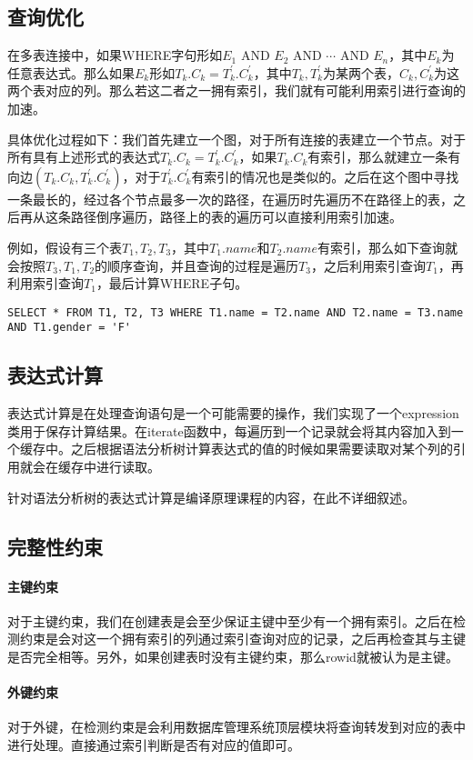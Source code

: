 \documentclass[10pt]{article}
\begin{document}
\subsection{查询优化}
在多表连接中，如果WHERE字句形如$E_1 \text{ AND } E_2 \text{ AND } \cdots \text{ AND } E_n$，其中$E_k$为任意表达式。那么如果$E_k$形如$T_k.C_k = T^\prime_k.C^\prime_k$，其中$T_k, T_k^\prime$为某两个表，$C_k, C_k^\prime$为这两个表对应的列。那么若这二者之一拥有索引，我们就有可能利用索引进行查询的加速。

具体优化过程如下：我们首先建立一个图，对于所有连接的表建立一个节点。对于所有具有上述形式的表达式$T_k.C_k = T^\prime_k.C^\prime_k$，如果$T_k.C_k$有索引，那么就建立一条有向边$(T_k.C_k, T_k^\prime.C_k^\prime)$，对于$T_k^\prime.C_k^\prime$有索引的情况也是类似的。之后在这个图中寻找一条最长的，经过各个节点最多一次的路径，在遍历时先遍历不在路径上的表，之后再从这条路径倒序遍历，路径上的表的遍历可以直接利用索引加速。

例如，假设有三个表$T_1, T_2, T_3$，其中$T_1.name$和$T_2.name$有索引，那么如下查询就会按照$T_3, T_1, T_2$的顺序查询，并且查询的过程是遍历$T_3$，之后利用索引查询$T_1$，再利用索引查询$T_1$，最后计算WHERE子句。
\begin{verbatim}
SELECT * FROM T1, T2, T3 WHERE T1.name = T2.name AND T2.name = T3.name AND T1.gender = 'F'
\end{verbatim}

\subsection{表达式计算}
表达式计算是在处理查询语句是一个可能需要的操作，我们实现了一个expression类用于保存计算结果。在iterate函数中，每遍历到一个记录就会将其内容加入到一个缓存中。之后根据语法分析树计算表达式的值的时候如果需要读取对某个列的引用就会在缓存中进行读取。

针对语法分析树的表达式计算是编译原理课程的内容，在此不详细叙述。
\subsection{完整性约束}
\paragraph{主键约束} 对于主键约束，我们在创建表是会至少保证主键中至少有一个拥有索引。之后在检测约束是会对这一个拥有索引的列通过索引查询对应的记录，之后再检查其与主键是否完全相等。另外，如果创建表时没有主键约束，那么rowid就被认为是主键。
\paragraph{外键约束} 对于外键，在检测约束是会利用数据库管理系统顶层模块将查询转发到对应的表中进行处理。直接通过索引判断是否有对应的值即可。
\end{document}
